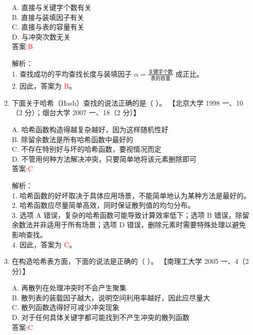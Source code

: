 \documentclass[lang=cn,newtx,10pt,scheme=chinese]{../../../elegantbook}
\begin{document}
\begin{enumerate}
    A. 直接与关键字个数有关 \\  
    B. 直接与装填因子有关 \\  
    C. 直接与表的容量有关 \\  
    D. 与冲突次数无关 \\  

    答案:\textcolor{red}{B}

    解析：\\
    1. 查找成功的平均查找长度与装填因子 $\alpha = \frac{\text{关键字个数}}{\text{表的容量}}$ 成正比。\\
    2. 因此，答案为 \textcolor{red}{B}。\\

    \item 下面关于哈希（Hash）查找的说法正确的是（ ）。  
    【北京大学 1998 一、10（2 分）；烟台大学 2007 一、18（2 分）】  

    A. 哈希函数构造得越复杂越好，因为这样随机性好 \\  
    B. 除留余数法是所有哈希函数中最好的 \\  
    C. 不存在特别好与坏的哈希函数，要视情况而定 \\  
    D. 不管用何种方法解决冲突，只要简单地将该元素删除即可 \\  

    答案:\textcolor{red}{C}

    解析：\\
    1. 哈希函数的好坏取决于具体应用场景，不能简单地认为某种方法是最好的。\\
    2. 哈希函数应尽量简单高效，同时保证散列值的均匀分布。\\
    3. 选项 A 错误，复杂的哈希函数可能导致计算效率低下；选项 B 错误，除留余数法并非适用于所有场景；选项 D 错误，删除元素时需要特殊处理以避免影响查找。\\
    4. 因此，答案为 \textcolor{red}{C}。\\

\item 在构造哈希表方面，下面的说法是正确的（ ）。  
    【南理工大学 2005 一、4（2 分）】  

    A. 再散列在处理冲突时不会产生聚集 \\  
    B. 散列表的装载因子越大，说明空间利用率越好，因此应尽量大 \\  
    C. 散列函数选得好可减少冲突现象 \\  
    D. 对于任何具体关键字都可能找到不产生冲突的散列函数 \\  

    答案:\textcolor{red}{C}


\end{enumerate}
\end{document}
